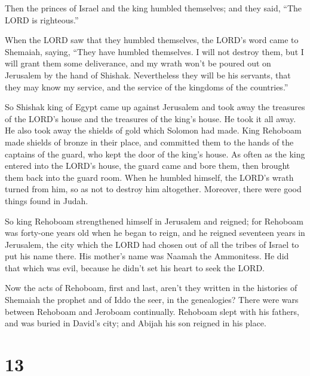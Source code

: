  Then the princes of Israel and the king humbled themselves;
and they said, ``The LORD is righteous.''

 When the LORD saw that they humbled themselves, the LORD's
word came to Shemaiah, saying, ``They have humbled themselves. I will
not destroy them, but I will grant them some deliverance, and my wrath
won't be poured out on Jerusalem by the hand of Shishak. 
Nevertheless they will be his servants, that they may know my service,
and the service of the kingdoms of the countries.''

 So Shishak king of Egypt came up against Jerusalem and took
away the treasures of the LORD's house and the treasures of the king's
house. He took it all away. He also took away the shields of gold which
Solomon had made.  King Rehoboam made shields of bronze in
their place, and committed them to the hands of the captains of the
guard, who kept the door of the king's house.  As often as
the king entered into the LORD's house, the guard came and bore them,
then brought them back into the guard room.  When he
humbled himself, the LORD's wrath turned from him, so as not to destroy
him altogether. Moreover, there were good things found in Judah.

 So king Rehoboam strengthened himself in Jerusalem and
reigned; for Rehoboam was forty-one years old when he began to reign,
and he reigned seventeen years in Jerusalem, the city which the LORD had
chosen out of all the tribes of Israel to put his name there. His
mother's name was Naamah the Ammonitess.  He did that which
was evil, because he didn't set his heart to seek the LORD.

 Now the acts of Rehoboam, first and last, aren't they
written in the histories of Shemaiah the prophet and of Iddo the seer,
in the genealogies? There were wars between Rehoboam and Jeroboam
continually.  Rehoboam slept with his fathers, and was
buried in David's city; and Abijah his son reigned in his place.

\hypertarget{section-12}{%
\section{13}\label{section-12}}


